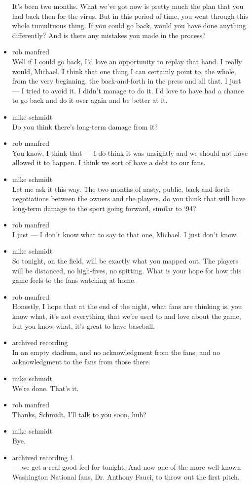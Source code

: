 \begin{itemize}
  It's been two months. What we've got now is pretty much the plan that
  you had back then for the virus. But in this period of time, you went
  through this whole tumultuous thing. If you could go back, would you
  have done anything differently? And is there any mistakes you made in
  the process?
\item
  rob manfred\\
  Well if I could go back, I'd love an opportunity to replay that hand.
  I really would, Michael. I think that one thing I can certainly point
  to, the whole, from the very beginning, the back-and-forth in the
  press and all that. I just --- I tried to avoid it. I didn't manage to
  do it. I'd love to have had a chance to go back and do it over again
  and be better at it.
\item
  mike schmidt\\
  Do you think there's long-term damage from it?
\item
  rob manfred\\
  You know, I think that --- I do think it was unsightly and we should
  not have allowed it to happen. I think we sort of have a debt to our
  fans.
\item
  mike schmidt\\
  Let me ask it this way. The two months of nasty, public,
  back-and-forth negotiations between the owners and the players, do you
  think that will have long-term damage to the sport going forward,
  similar to `94?
\item
  rob manfred\\
  I just --- I don't know what to say to that one, Michael. I just don't
  know.
\item
  mike schmidt\\
  So tonight, on the field, will be exactly what you mapped out. The
  players will be distanced, no high-fives, no spitting. What is your
  hope for how this game feels to the fans watching at home.
\item
  rob manfred\\
  Honestly, I hope that at the end of the night, what fans are thinking
  is, you know what, it's not everything that we're used to and love
  about the game, but you know what, it's great to have baseball.
\item
  archived recording\\
  In an empty stadium, and no acknowledgment from the fans, and no
  acknowledgment to the fans from those there.
\item
  mike schmidt\\
  We're done. That's it.
\item
  rob manfred\\
  Thanks, Schmidt. I'll talk to you soon, huh?
\item
  mike schmidt\\
  Bye.
\item
  archived recording 1\\
  --- we get a real good feel for tonight. And now one of the more
  well-known Washington National fans, Dr. Anthony Fauci, to throw out
  the first pitch.
\end{itemize}

